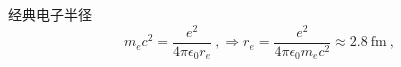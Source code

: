 \documentclass[12pt,a4paper]{article}
\begin{document}
经典电子半径
\begin{equation}
m_e c^2 = \frac{e^2}{4\pi \epsilon_0 r_e} ~, \Longrightarrow r_e = \frac{e^2}{4\pi \epsilon_0 m_e c^2} \approx 2.8 ~\text{fm} ~,
\end{equation}



















































\end{document}

